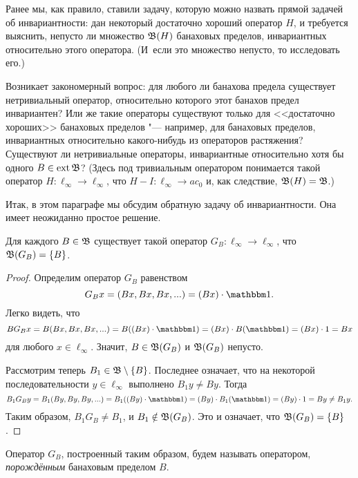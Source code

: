 Ранее мы, как правило, ставили задачу, которую можно назвать прямой задачей об инвариантности:
дан некоторый достаточно хороший оператор $H$, и требуется выяснить, непусто ли множество $\mathfrak{B}(H)$
банаховых пределов, инвариантных относительно этого оператора.
(И~если это множество непусто, то исследовать его.)

Возникает закономерный вопрос: для любого ли банахова предела существует нетривиальный оператор,
относительно которого этот банахов предел инвариантен?
Или же такие операторы существуют только для <<достаточно хороших>>
банаховых пределов "--- например, для банаховых пределов, инвариантных относительно какого-нибудь из операторов растяжения?
Существуют ли нетривиальные операторы, инвариантные относительно хотя бы одного $B\in\operatorname{ext} \mathfrak{B}$?
(Здесь под тривиальным оператором понимается такой оператор
$H:\ell_\infty \to \ell_\infty$, что $H-I:\ell_\infty \to ac_0$ и,
как следствие, $\mathfrak{B}(H) = \mathfrak{B}$.)

Итак, в этом параграфе мы обсудим обратную задачу об инвариантности.
Она имеет неожиданно простое решение.

\begin{theorem}
	\label{thm:generated_operator_G_B}
	Для каждого $B\in \mathfrak{B}$ существует такой оператор $G_B:\ell_\infty \to \ell_\infty$,
	что $\mathfrak{B}(G_B) = \{B\}$.
\end{theorem}

\begin{proof}
	Определим оператор $G_B$ равенством
	\begin{equation}
		G_B x = (Bx, Bx, Bx, ...) = (Bx)\cdot\one
		.
	\end{equation}
	Легко видеть, что
	\begin{equation}
		B G_B x = B(Bx, Bx, Bx, ...) = B((Bx)\cdot\one) = (Bx)\cdot B(\one)= (Bx)\cdot 1 = Bx
	\end{equation}
	для любого $x\in\ell_\infty$.
	Значит, $B\in \mathfrak{B} (G_B)$ и $\mathfrak{B} (G_B)$ непусто.

	Рассмотрим теперь $B_1 \in \mathfrak{B} \setminus\{B\}$.
	Последнее означает, что на некоторой последовательности $y\in\ell_\infty$ выполнено $B_1y \ne By$.
	Тогда
	\begin{equation}
		B_1 G_B y = B_1(By, By, By, ...) = B_1((By)\cdot\one) = (By)\cdot B_1(\one)= (By)\cdot 1 = By \ne B_1y
		.
	\end{equation}
	Таким образом, $B_1 G_B \ne B_1$, и $B_1 \notin \mathfrak{B} (G_B)$.
	Это и означает, что $\mathfrak{B}(G_B) = \{B\}$.
\end{proof}

\begin{definition}
	Оператор $G_B$, построенный таким образом, будем называть оператором,
	\emph{порождённым} банаховым пределом $B$.
\end{definition}

